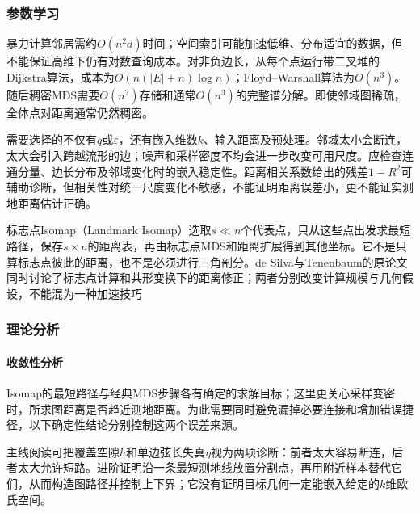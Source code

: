 \subsubsection{参数学习}

暴力计算邻居需约$O(n^2d)$时间；空间索引可能加速低维、分布适宜的数据，但不能保证高维下仍有对数查询成本。对非负边长，从每个点运行带二叉堆的Dijkstra算法，成本为$O(n(|E|+n)\log n)$；Floyd--Warshall算法为$O(n^3)$。随后稠密MDS需要$O(n^2)$存储和通常$O(n^3)$的完整谱分解。即使邻域图稀疏，全体点对距离通常仍然稠密。

需要选择的不仅有$q$或$\varepsilon$，还有嵌入维数$k$、输入距离及预处理。邻域太小会断连，太大会引入跨越流形的边；噪声和采样密度不均会进一步改变可用尺度。应检查连通分量、边长分布及邻域变化时的嵌入稳定性。距离相关系数给出的残差$1-R^2$可辅助诊断，但相关性对统一尺度变化不敏感，不能证明距离误差小，更不能证实测地距离估计正确。

标志点Isomap（Landmark Isomap）选取$s\ll n$个代表点，只从这些点出发求最短路径，保存$s\times n$的距离表，再由标志点MDS和距离扩展得到其他坐标。它不是只算标志点彼此的距离，也不是必须进行三角剖分。de Silva与Tenenbaum的原论文同时讨论了标志点计算和共形变换下的距离修正；两者分别改变计算规模与几何假设，不能混为一种加速技巧

\subsubsection{理论分析}
\label{sec:dim-isomap-theory}

\paragraph{收敛性分析}

Isomap的最短路径与经典MDS步骤各有确定的求解目标；这里更关心采样变密时，所求图距离是否趋近测地距离。为此需要同时避免漏掉必要连接和增加错误捷径，以下确定性结论分别控制这两个误差来源。

主线阅读可把覆盖空隙$h$和单边弦长失真$\eta$视为两项诊断：前者太大容易断连，后者太大允许短路。进阶证明沿一条最短测地线放置分割点，再用附近样本替代它们，从而构造图路径并控制上下界；它没有证明目标几何一定能嵌入给定的$k$维欧氏空间。

